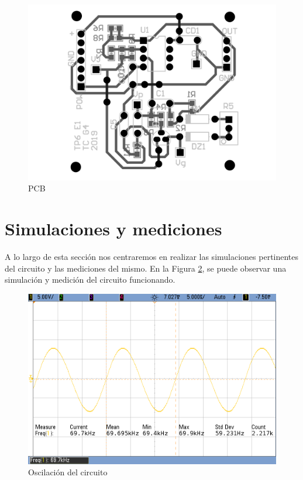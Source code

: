\begin{figure}[h]
\begin{centering}
\includegraphics[scale=0.25]{../Ex1/Resources/PCB}
\par\end{centering}
\caption{PCB}
\label{1_11}

\end{figure}

\section{Simulaciones y mediciones}

A lo largo de esta sección nos centraremos en realizar las simulaciones
pertinentes del circuito y las mediciones del mismo. En la Figura
\ref{1_16}, se puede observar una simulación y medición del circuito
funcionando.

\begin{figure}[h]
\begin{centering}
\includegraphics[scale=0.35]{../Ex1/Resources/Oscilacion}
\par\end{centering}
\caption{Oscilación del circuito}
\label{1_16}

\end{figure}

